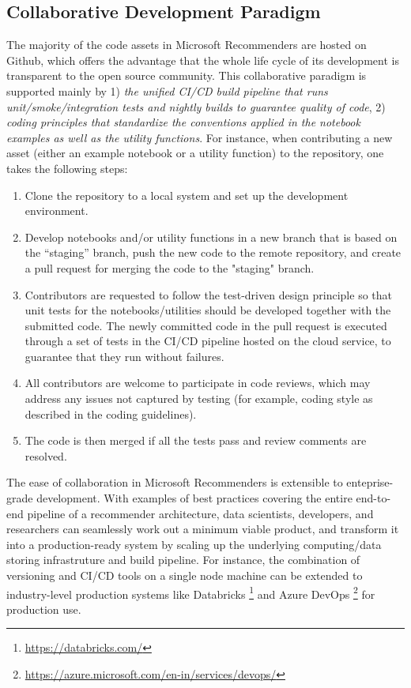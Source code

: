 \subsection{Collaborative Development Paradigm} %

The majority of the code assets in Microsoft Recommenders are hosted on Github, which offers the advantage that the whole life cycle of its development is transparent to the open source community. This collaborative paradigm is supported mainly by 1) \textit{the unified CI/CD build pipeline that runs unit/smoke/integration tests and nightly builds to guarantee quality of code}, 2) \textit{coding principles that standardize the conventions applied in the notebook examples as well as the utility functions}. For instance, when contributing a new asset (either an example notebook or a utility function) to the repository, one takes the following steps:
\begin{enumerate}
    \item Clone the repository to a local system and set up the development environment.
    \item Develop notebooks and/or utility functions in a new branch that is based on the ``staging'' branch, push the new code to the remote repository, and create a pull request for merging the code to the "staging" branch.
    \item Contributors are requested to follow the test-driven design principle so that unit tests for the notebooks/utilities should be developed together with the submitted code. The newly committed code in the pull request is executed through a set of tests in the CI/CD pipeline hosted on the cloud service, to guarantee that they run without failures.
    \item All contributors are welcome to participate in code reviews, which may address any issues not captured by testing 
    (for example, coding style as described in the coding guidelines).  
    \item The code is then merged if all the tests pass and review comments are resolved.
\end{enumerate}

The ease of collaboration in Microsoft Recommenders is extensible to enteprise-grade development. With examples of best practices covering the entire end-to-end pipeline of a recommender architecture, data scientists, developers, and researchers can seamlessly work out a minimum viable product, and transform it into a production-ready system by scaling up the underlying computing/data storing infrastruture and build pipeline. For instance, the combination of versioning and CI/CD tools on a single node machine can be extended to industry-level production systems like Databricks \footnote{\url{https://databricks.com/}} and Azure DevOps \footnote{\url{https://azure.microsoft.com/en-in/services/devops/}} for production use.